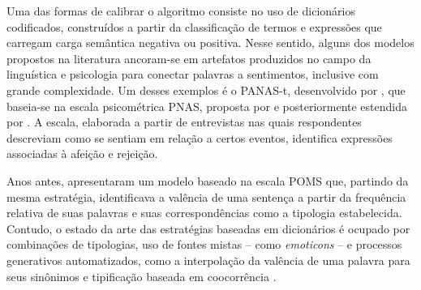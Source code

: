 \documentclass[
12pt,				%
openright,			%
twoside,			%
a4paper,			%
english,			%
french,				%
spanish,			%
brazil				%
]{abntex2}
\begin{document}
Uma das formas de calibrar o algoritmo consiste no uso de dicionários codificados, construídos a partir da classificação de termos e expressões que carregam carga semântica negativa ou positiva. Nesse sentido, alguns dos modelos propostos na literatura ancoram-se em artefatos produzidos no campo da linguística e psicologia para conectar palavras a sentimentos, inclusive com grande complexidade. Um desses exemplos é o PANAS-t, desenvolvido por  , que baseia-se na escala psicométrica PNAS, proposta por  e posteriormente estendida por . A escala, elaborada a partir de entrevistas nas quais respondentes descreviam como se sentiam em relação a certos eventos, identifica expressões associadas à afeição e rejeição. 

Anos antes,  apresentaram um modelo baseado na escala POMS \cite{mcnair2003profile} que, partindo da mesma estratégia, identificava a valência de uma sentença a partir da frequência relativa de suas palavras e suas correspondências como a tipologia estabelecida. Contudo, o estado da arte das estratégias baseadas em dicionários é ocupado por combinações de tipologias, uso de fontes mistas -- como \emph{emoticons} --  e processos generativos automatizados, como a interpolação da valência de uma palavra para seus sinônimos e tipificação baseada em coocorrência \cite{hogenboom2013exploiting, hutto2014vader, thelwall2014sentistrength, canuto2016exploiting}.
\end{document}
